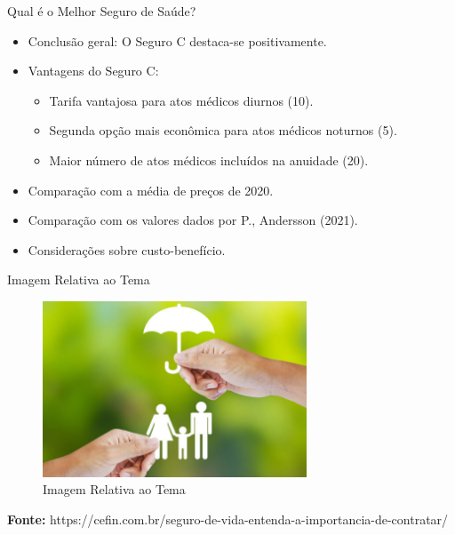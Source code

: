 \documentclass[7]{beamer}
\begin{document}
\begin{frame}{Qual é o Melhor Seguro de Saúde?}
\begin{itemize}
  \item Conclusão geral: O Seguro C destaca-se positivamente.
  \item Vantagens do Seguro C:
    \begin{itemize}
      \item Tarifa vantajosa para atos médicos diurnos (10).
      \item Segunda opção mais econômica para atos médicos noturnos (5).
      \item Maior número de atos médicos incluídos na anuidade (20).
    \end{itemize}
  \item Comparação com a média de preços de 2020.
  \item Comparação com os valores dados por P., Andersson (2021).
  \item Considerações sobre custo-benefício.
\end{itemize}
\end{frame}

\begin{frame}{Imagem Relativa ao Tema}
\begin{figure}[H]
\centering
\includegraphics[width=0.7\textwidth]{imagemCapa.jpg} 
\caption{Imagem Relativa ao Tema}
\end{figure}

\textbf{Fonte:} https://cefin.com.br/seguro-de-vida-entenda-a-importancia-de-contratar/
\end{frame}
\end{document}
